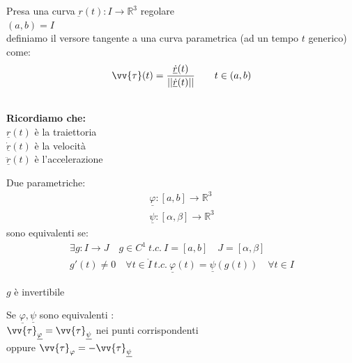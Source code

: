 \documentclass[a4paper, oneside]{article}
\begin{document}
\begin{definition}
    Presa una curva $\underbar{r}(t):I \to \mathbb{R}^3$ regolare\\
     $(a,b) = I$\\
    definiamo il versore tangente a una curva parametrica (ad un tempo $t$ generico) come:
    \begin{gather*}
        \vv{\tau}(t) = \frac{\underline{\dot{r}}(t)}{||\underline{\dot{r}}(t)||} \qquad t \in (a,b)
    \end{gather*}
\end{definition}
\hfil\\
\textbf{Ricordiamo che:}\\
$\underline{r}(t)$ è la traiettoria\\
$\underline{\dot{r}}(t)$ è la velocità\\
$\underline{\ddot{r}}(t)$ è l'accelerazione

\begin{definition}
    Due parametriche:
    \begin{gather*}
        \underline{\varphi}:[a,b] \to \mathbb{R}^3\\ 
        \underline{\psi}: [\alpha,\beta] \to \mathbb{R}^3 
    \end{gather*}
    sono equivalenti se:
    \begin{gather*}
        \exists g : I \to J \quad g \in C^1 \ t.c. \ I = [a,b] \quad J = [\alpha,\beta]\\
        g'(t) \neq 0 \quad \forall t \in \mathring{I} \ t.c. \ \underline{\varphi}(t) = \underline{\psi}(g(t)) \quad \forall t \in I
    \end{gather*}
    \begin{observation}
        $g$ è invertibile
    \end{observation}
    \begin{observation}
        Se $\underline{\varphi}, \underline{\psi}$ sono equivalenti :\\
        $\vv{\tau}_{\underline{\varphi}} = \vv{\tau}_{\underline{\psi}}$ nei punti corrispondenti\\
        oppure $\vv{\tau}_\varphi = - \vv{\tau}_{\underline{\psi}}$
    \end{observation}
\end{definition}
\end{document}
